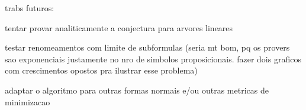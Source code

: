
\label{cap_conclusoes}

trabs futuros:

tentar provar analiticamente a conjectura para arvores lineares

testar renomeamentos com limite de subformulas (seria mt bom, pq os provers sao exponenciais justamente no nro de simbolos proposicionais. fazer dois graficos com crescimentos opostos pra ilustrar esse problema)

adaptar o algoritmo para outras formas normais e/ou outras metricas de minimizacao
